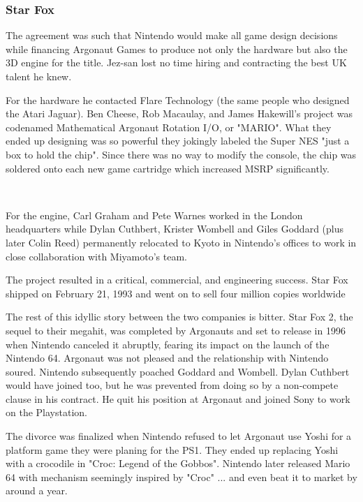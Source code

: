 \subsubsection{Star Fox}
The agreement was such that Nintendo would make all game design decisions while financing Argonaut Games to produce not only the hardware but also the 3D engine for the title. Jez-san lost no time hiring and contracting the best UK talent he knew.\\
\par
For the hardware he contacted Flare Technology (the same people who designed the Atari Jaguar). Ben Cheese, Rob Macaulay, and James Hakewill's project was codenamed Mathematical Argonaut Rotation I/O, or "MARIO". What they ended up designing was so powerful they jokingly labeled the Super NES "just a box to hold the chip". Since there was no way to modify the console, the chip was soldered onto each new game cartridge which increased MSRP significantly.\\
\par
{}\\
\par
For the engine, Carl Graham and Pete Warnes worked in the London headquarters while Dylan Cuthbert, Krister Wombell and Giles Goddard (plus later Colin Reed) permanently relocated to Kyoto in Nintendo's offices to work in close collaboration with Miyamoto's team.\\ 
\par
The project resulted in a critical, commercial, and engineering success. Star Fox shipped on February 21, 1993 and went on to sell four million copies worldwide\\
 \par

The rest of this idyllic story between the two companies is bitter. Star Fox 2, the sequel to their megahit, was completed by Argonauts and set to release in 1996 when Nintendo canceled it abruptly, fearing its impact on the launch of the Nintendo 64. Argonaut was not pleased and the relationship with Nintendo soured. Nintendo subsequently poached Goddard and Wombell. Dylan Cuthbert would have joined too, but he was prevented from doing so by a non-compete clause in his contract. He quit his position at Argonaut and joined Sony to work on the Playstation.\\
\par
The divorce was finalized when Nintendo refused to let Argonaut use Yoshi for a platform game they were planing for the PS1. They ended up replacing Yoshi with a crocodile in "Croc: Legend of the Gobbos". Nintendo later released Mario 64 with mechanism seemingly inspired by "Croc" ... and even beat it to market by around a year.





